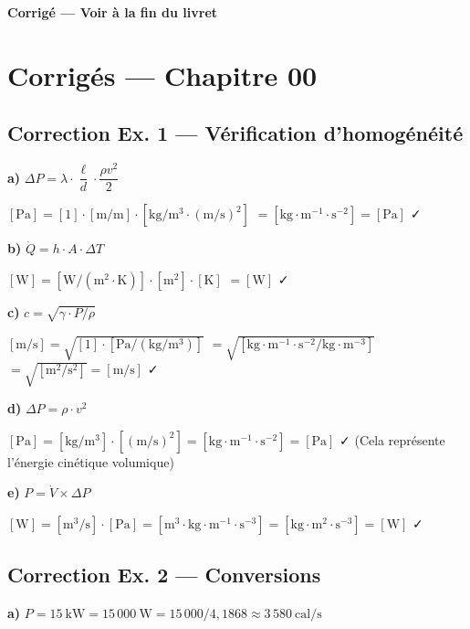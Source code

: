 \textbf{Corrigé — Voir à la fin du livret}

\newpage


\section*{Corrigés — Chapitre 00}

\subsection*{Correction Ex. 1 — Vérification d'homogénéité}

\textbf{a)} $\Delta P = \lambda \cdot \dfrac{\ell}{d} \cdot \dfrac{\rho v^2}{2}$

$[\mathrm{Pa}] = [1] \cdot [\mathrm{m/m}] \cdot [\mathrm{kg/m^3} \cdot \mathrm{(m/s)^2}]$
$= [\mathrm{kg \cdot m^{-1} \cdot s^{-2}}] = [\mathrm{Pa}]$ ✓

\textbf{b)} $\dot{Q} = h \cdot A \cdot \Delta T$

$[\mathrm{W}] = [\mathrm{W/(m^2 \cdot K)}] \cdot [\mathrm{m^2}] \cdot [\mathrm{K}]$
$= [\mathrm{W}]$ ✓

\textbf{c)} $c = \sqrt{\gamma \cdot P / \rho}$

$[\mathrm{m/s}] = \sqrt{[1] \cdot [\mathrm{Pa} / (\mathrm{kg/m^3})]}$
$= \sqrt{[\mathrm{kg \cdot m^{-1} \cdot s^{-2}} / \mathrm{kg \cdot m^{-3}}]}$
$= \sqrt{[\mathrm{m^2/s^2}]} = [\mathrm{m/s}]$ ✓

\textbf{d)} $\Delta P = \rho \cdot v^2$

$[\mathrm{Pa}] = [\mathrm{kg/m^3}] \cdot [\mathrm{(m/s)^2}] = [\mathrm{kg \cdot m^{-1} \cdot s^{-2}}] = [\mathrm{Pa}]$ ✓
(Cela représente l'énergie cinétique volumique)

\textbf{e)} $P = \dot{V} \times \Delta P$

$[\mathrm{W}] = [\mathrm{m^3/s}] \cdot [\mathrm{Pa}] = [\mathrm{m^3 \cdot kg \cdot m^{-1} \cdot s^{-3}}] = [\mathrm{kg \cdot m^2 \cdot s^{-3}}] = [\mathrm{W}]$ ✓

\subsection*{Correction Ex. 2 — Conversions}

\textbf{a)} $P = 15~\mathrm{kW} = 15\,000~\mathrm{W} = 15\,000 / 4{,}1868 \approx 3\,580~\mathrm{cal/s}$

